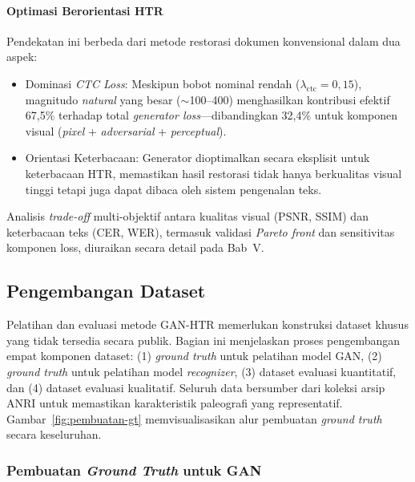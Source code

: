 \paragraph{Optimasi Berorientasi HTR}

Pendekatan ini berbeda dari metode restorasi dokumen konvensional dalam dua aspek:
\begin{itemize}[noitemsep, topsep=0pt, partopsep=0pt, leftmargin=1.5em]
  \item Dominasi \textit{CTC Loss}: Meskipun bobot nominal rendah ($\lambda_{\text{ctc}}=0,15$), magnitudo \textit{natural} yang besar ($\sim$100--400) menghasilkan kontribusi efektif 67,5\% terhadap total \textit{generator loss}---dibandingkan 32,4\% untuk komponen visual (\textit{pixel} + \textit{adversarial} + \textit{perceptual}).
  \item Orientasi Keterbacaan: Generator dioptimalkan secara eksplisit untuk keterbacaan HTR, memastikan hasil restorasi tidak hanya berkualitas visual tinggi tetapi juga dapat dibaca oleh sistem pengenalan teks.
\end{itemize}

\noindent Analisis \textit{trade-off} multi-objektif antara kualitas visual (PSNR, SSIM) dan keterbacaan teks (CER, WER), termasuk validasi \textit{Pareto front} dan sensitivitas komponen loss, diuraikan secara detail pada Bab~V.



\subsection{Pengembangan Dataset}
\label{sec:pengembangan-dataset}

Pelatihan dan evaluasi metode GAN-HTR memerlukan konstruksi dataset khusus yang tidak tersedia secara publik. Bagian ini menjelaskan proses pengembangan empat komponen dataset: (1) \textit{ground truth} untuk pelatihan model GAN, (2) \textit{ground truth} untuk pelatihan model \textit{recognizer}, (3) dataset evaluasi kuantitatif, dan (4) dataset evaluasi kualitatif. Seluruh data bersumber dari koleksi arsip ANRI untuk memastikan karakteristik paleografi yang representatif. Gambar~\ref{fig:pembuatan-gt} memvisualisasikan alur pembuatan \textit{ground truth} secara keseluruhan.

\subsubsection{Pembuatan \textit{Ground Truth} untuk GAN}

